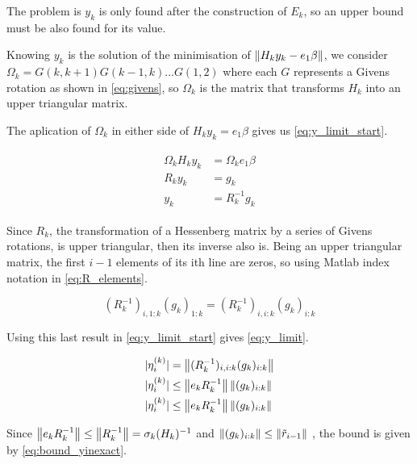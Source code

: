The problem is $y_{k}$ is only found after the construction of $E_{k}$, so an upper bound must be also found for its value.

Knowing $y_{k}$ is the solution of the minimisation of $ \left\lVert H_{k}y_{k} - e_{1}\beta\right\rVert $, we consider $\Omega_{k} =G(k,k+1) G(k-1,k) \dots G(1,2)$ where each $G$ represents a Givens rotation as shown in \ref{eq:givens}, so $\Omega_{k}$ is the matrix that transforms $H_{k}$ into an upper triangular matrix.

The aplication of $\Omega_{k}$ in either side of $H_{k}y_{k}  = e_{1}\beta$ gives us \ref{eq:y_limit_start}.

\begin{align}\label{eq:y_limit_start}
    \begin{split}
        \Omega_{k}H_{k}y_{k}&=\Omega_{k}e_{1}\beta\\
        R_{k}y_{k}&=g_{k}\\
        y_{k}&=R^{-1}_{k}g_{k}
    \end{split}
\end{align}

Since $R_{k}$, the transformation of a Hessenberg matrix by a series of Givens rotations, is upper triangular, then its inverse also is.
Being an upper triangular matrix, the first $i-1$ elements of its ith line are zeros, so using Matlab index notation in \ref{eq:R_elements}.

\begin{equation}\label{eq:R_elements}
    (R^{-1}_{k})_{i,1:k}(g_{k})_{1:k} = (R^{-1}_{k})_{i,i:k}(g_{k})_{i:k}
\end{equation}

Using this last result in \ref{eq:y_limit_start} gives \ref{eq:y_limit}.

\begin{align}\label{eq:y_limit}
    \begin{split}
        |\eta^{(k)}_{i}| &= \left\lVert(R^{-1}_{k})_{i,i:k}(g_{k})_{i:k}\right\rVert\\
        |\eta^{(k)}_{i}| &\leq \left\lVert e_{k}R^{-1}_{k}\right\rVert \left\lVert(g_{k})_{i:k}\right\rVert\\
        |\eta^{(k)}_{i}| &\leq \left\lVert e_{k}R^{-1}_{k}\right\rVert \left\lVert(g_{k})_{i:k}\right\rVert\\
    \end{split}
\end{align}

Since $\left\lVert e_{k}R^{-1}_{k}\right\rVert \leq \left\lVert R^{-1}_{k}\right\rVert = \sigma_{k}(H_{k})^{-1}$ and $\left\lVert(g_{k})_{i:k}\right\rVert \leq \left\lVert\tilde{r}_{i-1}\right\rVert$ \cite{simoncini2003theory}, the bound is given by \ref{eq:bound_yinexact}.


